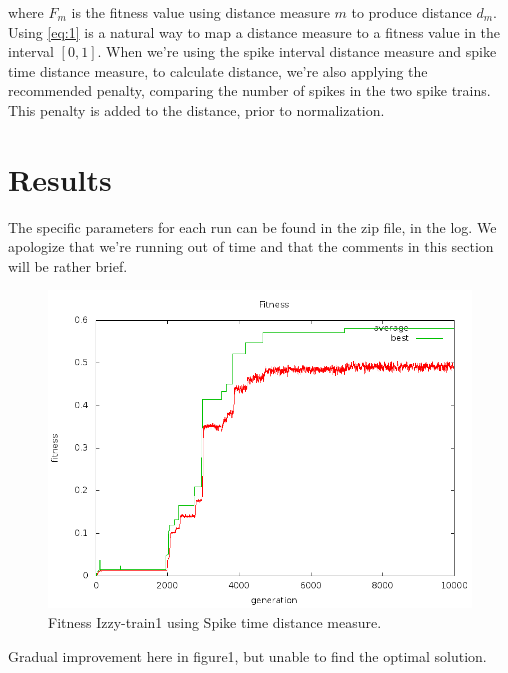 \documentclass[a4paper]{article}
\begin{document}
\noindent where $F_m$ is the fitness value using distance measure $m$ to produce distance $d_m$. Using \eqref{eq:1} is a natural way to map a distance measure to a fitness value in the interval $[0,1]$. When we're using the spike interval distance measure and spike time distance measure, to calculate distance, we're also applying the recommended penalty, comparing the number of spikes in the two spike trains. This penalty is added to the distance, prior to normalization.

\newpage
\section{Results}

The specific parameters for each run can be found in the zip file, in the log. We apologize that we're running out of time and that the comments in this section will be rather brief.
\label{sec:results}

\begin{figure}[htb!]
  \centering
  \includegraphics[width=\textwidth]{SpikeTime-izzy1-fitness-plot.png}
  \caption{Fitness Izzy-train1 using Spike time distance measure.}
\end{figure}

Gradual improvement here in figure1, but unable to find the optimal solution.
\end{document}

